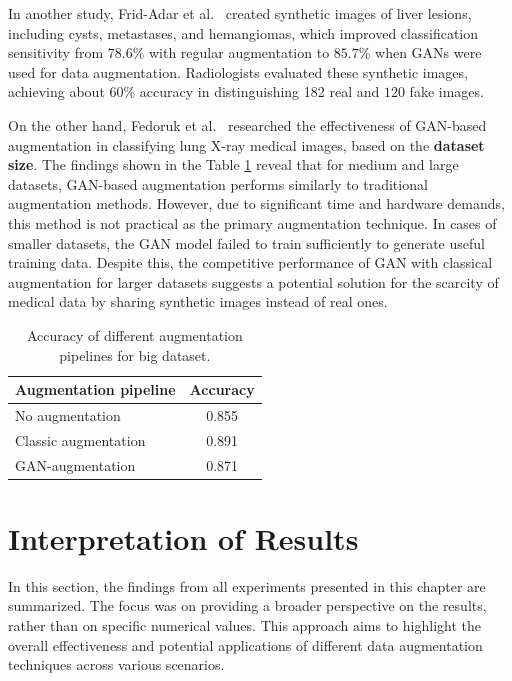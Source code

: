 In another study, Frid-Adar et al.~\cite{Frid_Adar_2018} created synthetic images of liver lesions, including cysts, metastases, and hemangiomas, which improved classification sensitivity from $78.6$\% with regular augmentation to $85.7$\% when GANs were used for data augmentation. Radiologists evaluated these synthetic images, achieving about $60$\% accuracy in distinguishing 182 real and $120$ fake images.

On the other hand, Fedoruk et al.~\cite{CovidGAN} researched the effectiveness of GAN-based augmentation in classifying lung X-ray medical images, based on the \textbf{dataset size}. The findings shown in the Table \ref{table:augmentation} reveal that for medium and large datasets, GAN-based augmentation performs similarly to traditional augmentation methods. However, due to significant time and hardware demands, this method is not practical as the primary augmentation technique. In cases of smaller datasets, the GAN model failed to train sufficiently to generate useful training data. Despite this, the competitive performance of GAN with classical augmentation for larger datasets suggests a potential solution for the scarcity of medical data by sharing synthetic images instead of real ones.

\begin{table}[h!]
\centering
\caption{Accuracy of different augmentation pipelines for big dataset.}
\begin{tabular}{|l|c|}
\hline
\textbf{Augmentation pipeline} & \textbf{Accuracy} \\
\hline
No augmentation & 0.855 \\
\hline
Classic augmentation & 0.891 \\
\hline
GAN-augmentation & 0.871 \\
\hline
\end{tabular}
\label{table:augmentation}
\end{table}

\section{Interpretation of Results}
\label{sec:resultsInterpretation}


In this section, the findings from all experiments presented in this chapter are summarized. The focus was on providing a broader perspective on the results, rather than on specific numerical values. This approach aims to highlight the overall effectiveness and potential applications of different data augmentation techniques across various scenarios.

